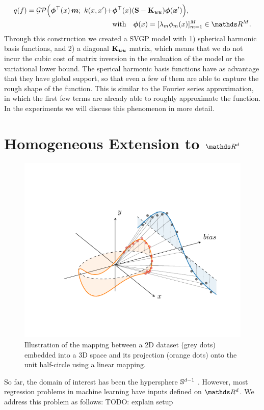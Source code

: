 \begin{equation}
\begin{aligned}
    q(f) =
    \GP\Big(\bm{\phi}^\top(x)\,\vm;\ k(x, x') + &{\bm{\phi}}^\top(x)(\MS - \Kuu){\bm{\phi}}(\vx') \Big),\\ &\text{with}\quad\bm{\phi}(x) = [\lambda_m \phi_m(x)]_{m=1}^M \in \Reals^M.
\end{aligned}
\end{equation}
Through this construction we created a SVGP model with 1) spherical harmonic basis functions, and 2) a diagonal $\mathbf{{K}}_{\bm{u} \bm{u}}$ matrix, which means that we do not incur the cubic cost of matrix inversion in the evaluation of the model or the variational lower bound. The sperical harmonic basis functions have as advantage that they have global support, so that even a few of them are able to capture the rough shape of the function. This is similar to the Fourier series approximation, in which the first few terms are already able to roughly approximate the function. In the experiments we will discuss this phenomenon in more detail.

\section{Homogeneous Extension to $\Reals^d$}

\begin{figure}[tbh!]
    \centering
    \includegraphics[width=.6\textwidth]{mapping}
    \caption{Illustration of the mapping between a 2D dataset (grey dots) embedded into a 3D space and its projection (orange dots) onto the unit half-circle using a linear mapping.\label{fig:mapping}}
\end{figure}

So far, the domain of interest has been the hypersphere $\mathbb{S}^{d-1}$ . However, most regression problems in machine learning have inputs defined on $\Reals^d$. We address this problem as follows:
TODO: explain setup

